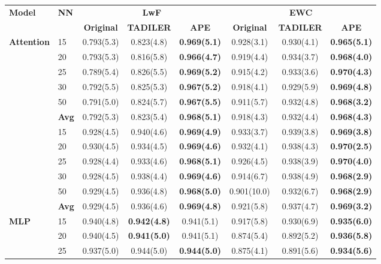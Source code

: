 \documentclass[pdflatex,sn-mathphys-num]{sn-jnl}%
\theoremstyle{thmstyleone}%
\theoremstyle{thmstyletwo}%
\theoremstyle{thmstylethree}%
\begin{document}
\begin{table}
{\begin{tabular}{llcccccc}
  \toprule
  \bfseries Model & \bfseries NN & \multicolumn{3}{c}{\bfseries LwF} & \multicolumn{3}{c}{\bfseries EWC} \\
  \cmidrule(lr){3-5} \cmidrule(lr){6-8}
 &  \bfseries  & \bfseries Original & \bfseries TADILER & \bfseries APE & \bfseries Original & \bfseries TADILER & \bfseries APE \\
  \midrule
\multirow{7}{*}{\textbf{Attention}} & 15 & 0.793(5.3) & 0.823(4.8) & \textbf{0.969(5.1)} & 0.928(3.1) & 0.930(4.1) & \textbf{0.965(5.1)} \\
 & 20 & 0.793(5.3) & 0.816(5.8) & \textbf{0.966(4.7)} & 0.919(4.4) & 0.934(3.7) & \textbf{0.968(4.0)} \\
 & 25 & 0.789(5.4) & 0.826(5.5) & \textbf{0.969(5.2)} & 0.915(4.2) & 0.933(3.6) & \textbf{0.970(4.3)} \\
 & 30 & 0.792(5.5) & 0.825(5.3) & \textbf{0.967(5.2)} & 0.918(4.1) & 0.929(5.9) & \textbf{0.969(4.8)} \\
 & 50 & 0.791(5.0) & 0.824(5.7) & \textbf{0.967(5.5)} & 0.911(5.7) & 0.932(4.8) & \textbf{0.968(3.2)} \\
  \cmidrule(lr){2-8}
 & \textbf{Avg} & 0.792(5.3) & 0.823(5.4) & \textbf{0.968(5.1)} & 0.918(4.3) & 0.932(4.4) & \textbf{0.968(4.3)} \\
  \midrule
\multirow{7}{*}{\textbf{Residual}} & 15 & 0.928(4.5) & 0.940(4.6) & \textbf{0.969(4.9)} & 0.933(3.7) & 0.939(3.8) & \textbf{0.969(3.8)} \\
 & 20 & 0.930(4.5) & 0.934(4.5) & \textbf{0.969(4.6)} & 0.932(4.1) & 0.938(4.3) & \textbf{0.970(2.5)} \\
 & 25 & 0.928(4.4) & 0.933(4.6) & \textbf{0.968(5.1)} & 0.926(4.5) & 0.938(3.9) & \textbf{0.970(4.0)} \\
 & 30 & 0.928(4.5) & 0.938(4.4) & \textbf{0.969(4.6)} & 0.914(6.7) & 0.938(4.9) & \textbf{0.968(2.9)} \\
 & 50 & 0.929(4.5) & 0.936(4.8) & \textbf{0.968(5.0)} & 0.901(10.0) & 0.932(6.7) & \textbf{0.968(2.9)} \\
  \cmidrule(lr){2-8}
 & \textbf{Avg} & 0.929(4.5) & 0.936(4.6) & \textbf{0.969(4.8)} & 0.921(5.8) & 0.937(4.7) & \textbf{0.969(3.2)} \\
  \midrule
\multirow{7}{*}{\textbf{MLP}} & 15 & 0.940(4.8) & \textbf{0.942(4.8)} & 0.941(5.1) & 0.917(5.8) & 0.930(6.9) & \textbf{0.935(6.0)} \\
 & 20 & 0.940(4.5) & \textbf{0.941(5.0)} & 0.941(5.1) & 0.874(5.4) & 0.892(5.2) & \textbf{0.936(5.8)} \\
 & 25 & 0.937(5.0) & 0.944(5.0) & \textbf{0.944(5.0)} & 0.875(4.1) & 0.891(5.6) & \textbf{0.934(5.6)} \\

\end{tabular}}
\end{table}
\end{document}
